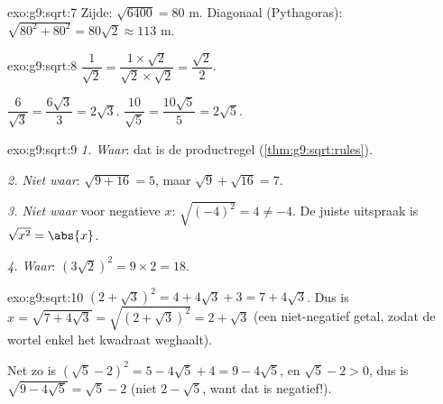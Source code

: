 \begin{solution}{exo:g9:sqrt:7}
Zijde: $\sqrt{6400} = 80$ m. Diagonaal (Pythagoras):
$\sqrt{80^2 + 80^2} = 80\sqrt2 \approx 113$ m.
\end{solution}

\begin{solution}{exo:g9:sqrt:8}
$\dfrac{1}{\sqrt2} = \dfrac{1 \times \sqrt2}{\sqrt2 \times \sqrt2}
= \dfrac{\sqrt2}{2}$.

$\dfrac{6}{\sqrt3} = \dfrac{6\sqrt3}{3} = 2\sqrt3$.
\quad
$\dfrac{10}{\sqrt5} = \dfrac{10\sqrt5}{5} = 2\sqrt5$.
\end{solution}

\begin{solution}{exo:g9:sqrt:9}
\emph{1. Waar}: dat is de productregel (\cref{thm:g9:sqrt:rules}).

\emph{2. Niet waar}: $\sqrt{9 + 16} = 5$, maar $\sqrt9 + \sqrt{16} = 7$.

\emph{3. Niet waar} voor negatieve $x$: $\sqrt{(-4)^2} = 4 \neq -4$. De juiste
uitspraak is $\sqrt{x^2} = \abs{x}$.

\emph{4. Waar}: $\left(3\sqrt2\right)^2 = 9 \times 2 = 18$.
\end{solution}

\begin{solution}{exo:g9:sqrt:10}
$\left(2 + \sqrt3\right)^2 = 4 + 4\sqrt3 + 3 = 7 + 4\sqrt3$. Dus is
$x = \sqrt{7 + 4\sqrt3} = \sqrt{\left(2+\sqrt3\right)^2} = 2 + \sqrt3$ (een
niet-negatief getal, zodat de wortel enkel het kwadraat weghaalt).

Net zo is $\left(\sqrt5 - 2\right)^2 = 5 - 4\sqrt5 + 4 = 9 - 4\sqrt5$, en
$\sqrt5 - 2 > 0$, dus is $\sqrt{9 - 4\sqrt5} = \sqrt5 - 2$ (niet
$2 - \sqrt5$, want dat is negatief!).
\end{solution}

